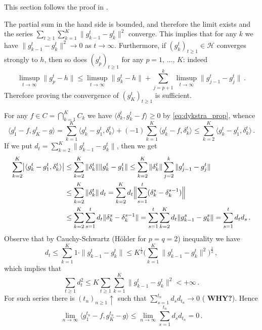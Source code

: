 \documentclass[a4paper]{article}
\newcommand{\Hcal}{\mathcal{H}}
\begin{document}
This section follows the proof in \cite{boyledykstra1986}.

The partial sum in the hand side is bounded, and therefore the limit exists and the
series $\sum_{t\geq 1} \sum_{k=1}^K \| g^t_{k-1} - g^t_k \|^2$ converge. This implies
that for any $k$ we have $\|g^t_{k-1} - g^t_k\|^2 \to 0$ as $t\to \infty$.
Furthermore, if $(g^t_k)_{t\geq 1}\in \Hcal$ converges strongly to $h$, then so does
$(g^t_p)_{t\geq 1}$ for any $p=1,\,\ldots,\,K$: indeed
\begin{equation*}
  \limsup_{t\to \infty} \| g^t_p - h \|
    \leq \limsup_{t\to \infty} \|g^t_k - h\|
      + \sum_{j=p+1}^k \limsup_{t\to \infty} \| g^t_{j-1} - g^t_j \|
    \,.
\end{equation*}
Therefore proving the convergence of $(g^t_K)_{t\geq 1}$ is sufficient.

For any $f\in C = \bigcap_{k=1}^K C_k$ we have $\langle \delta^t_k,  g^t_k - f \rangle
\geq 0$ by \eqref{eq:dykstra_prop}, whence
\begin{equation*}
  \langle g^t_1 - f, g^t_K - g \rangle
    = \sum_{k=1}^K \langle g^t_k - g^t_1, \delta^t_k \rangle
      + (-1) \sum_{k=1}^K \langle g^t_k - f, \delta^t_k \rangle
    \leq \sum_{k=2}^K \langle g^t_k - g^t_1, \delta^t_k \rangle
      \,.
\end{equation*}
If we put $d_t = \sum_{k=2}^K \| g^t_{k-1} - g^t_k \|$, then we get
\begin{align*}
  \sum_{k=2}^K \bigl\lvert \langle g^t_k - g^t_1, \delta^t_k \rangle \bigr\rvert
    &\leq \sum_{k=2}^K \|\delta^t_k\| \| g^t_k - g^t_1 \|
    \leq \sum_{k=2}^K \|\delta^t_k\| \sum_{j=2}^k \| g^t_{j-1} - g^t_j \|
    \\
    &\leq \sum_{k=2}^K \|\delta^t_k\| \, d_t
    = \sum_{k=2}^K d_t \Bigl\| \sum_{s=1}^t (\delta^s_k - \delta^{s-1}_k) \Bigr\|
    \\
    &\leq \sum_{k=2}^K \sum_{s=1}^t d_t \|\delta^s_k - \delta^{s-1}_k \|
    = \sum_{s=1}^t \sum_{k=2}^K d_t \|g^s_{k-1} - g^s_k \|
    = \sum_{s=1}^t d_t d_s
      \,.
\end{align*}
Observe that by Cauchy-Schwartz (H{\"o}lder for $p=q=2$) inequality we have
\begin{equation*}
  d_t
    \leq \sum_{k=1}^K 1 \cdot \| g^t_{k-1} - g^t_k \|
    \leq K^{\tfrac12} \biggl(
      \sum_{k=1}^K \| g^t_{k-1} - g^t_k \|^2
    \biggr)^{\tfrac12}
    \,,
\end{equation*}
which implies that
\begin{equation*}
  \sum_{t\geq 1} d^2_t
    \leq K \sum_{t\geq 1} \sum_{k=1}^K \| g^t_{k-1} - g^t_k \|^2
      < +\infty
    \,.
\end{equation*}
For such series there is $(t_n)_{n\geq1} \uparrow$ such that $\sum_{s=1}^{t_n} d_s
d_{t_n} \to 0$ ({\bf \color{red} WHY?}). Hence
\begin{equation*}
  \lim_{n \to \infty} \langle g^{t_n}_1 - f, g^{t_n}_K - g \rangle
    \leq \lim_{n \to \infty} \sum_{s=1}^{t_n} d_s d_{t_n}
    = 0
    \,.
\end{equation*}
\end{document}
